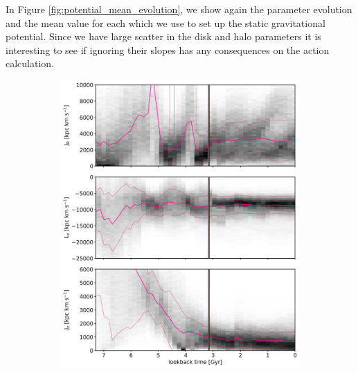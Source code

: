 In Figure \ref{fig:potential_mean_evolution}, we show again the parameter evolution and the mean value for each which we use to set up the static gravitational potential. Since we have large scatter in the disk and halo parameters it is interesting to see if ignoring their slopes has any consequences on the action calculation. 
\begin{figure}[htbp]
\captionsetup{format=plain}
    \begin{subfigure}[c]{0.48\textwidth}
    \centering
    	\includegraphics[width=\textwidth]{plots/Dynamics/prog2/action_time_evolution_hist_mean_prog2.png}
    \end{subfigure}
    ~
    \begin{subfigure}[c]{0.48\textwidth}
    \centering

\end{subfigure}
\end{figure}
